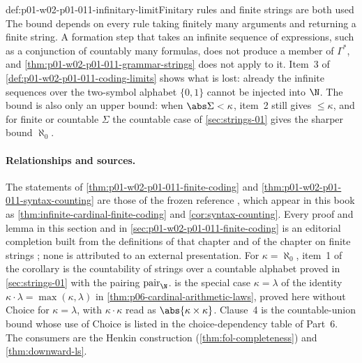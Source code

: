 \begin{hbwarning}{def:p01-w02-p01-011-infinitary-limit}{Finitary rules and finite strings are both used}
The bound depends on every rule taking finitely many arguments and returning
a finite string. A formation step that takes an infinite sequence of
expressions, such as a conjunction of countably many formulas, does not
produce a member of \(\Gamma^*\), and \cref{thm:p01-w02-p01-011-grammar-strings}
does not apply to it. Item~3 of \cref{def:p01-w02-p01-011-coding-limits}
shows what is lost: already the infinite sequences over the two-symbol
alphabet \(\{0,1\}\) cannot be injected into \(\N\). The bound is also only
an upper bound: when \(\abs\Sigma<\kappa\), item~2 still gives
\(\leq\kappa\), and for finite or countable \(\Sigma\) the countable case of
\cref{sec:strings-01} gives the sharper bound \(\aleph_0\).
\end{hbwarning}

\paragraph{Relationships and sources.}
The statements of \cref{thm:p01-w02-p01-011-finite-coding} and
\cref{thm:p01-w02-p01-011-syntax-counting} are those of the frozen reference
\cite[ch.~``Sets, Relations, Functions, and Cardinality'', section ``Choice
principles used later'', theorem ``Finite coding over an infinite cardinal''
and corollary ``Syntax counting'']{FrozenFormalLogicFiniteCoding}, which appear
in this book as \cref{thm:infinite-cardinal-finite-coding} and
\cref{cor:syntax-counting}. Every proof and lemma in this section and in
\cref{sec:p01-w02-p01-011-finite-coding} is an editorial completion built from
the definitions of that chapter and of the chapter on finite strings
\cite[ch.~``Finite Strings, Induction, and Recursion'']{FrozenFormalLogicFiniteCoding};
none is attributed to an external presentation. For \(\kappa=\aleph_0\),
item~1 of the corollary is the countability of strings over a countable
alphabet proved in \cref{sec:strings-01} with the pairing
\(\operatorname{pair}_{\N}\).  is the
special case \(\kappa=\lambda\) of the identity
\(\kappa\cdot\lambda=\max(\kappa,\lambda)\) in
\cref{thm:p06-cardinal-arithmetic-laws}, proved here without Choice for
\(\kappa=\lambda\), with \(\kappa\cdot\kappa\) read as
\(\abs{\kappa\times\kappa}\). Clause~4 is the countable-union bound whose
use of Choice is listed in the choice-dependency table of Part~6. The
consumers are the Henkin construction (\cref{thm:fol-completeness}) and
\cref{thm:downward-ls}.
